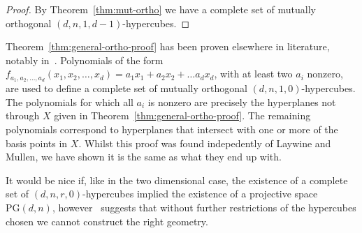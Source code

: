 \documentclass{article}
\newcommand{\PG}{\mathrm{PG}}
\begin{document}
\begin{proof}
  By Theorem~\ref{thm:mut-ortho} we have a complete set of mutually orthogonal \((d, n, 1, d - 1)\)-hypercubes.
\end{proof}


Theorem~\ref{thm:general-ortho-proof} has been proven elsewhere in literature, notably in~\cite{laywine1998discrete}. Polynomials of the form \(f_{a_1, a_2, \ldots, a_d}(x_1, x_2, \ldots, x_d) = a_1x_1 + a_2x_2 + \ldots a_d x_d\), with at least two \(a_i\) nonzero, are used to define a complete set of mutually orthogonal \((d, n, 1, 0)\)-hypercubes.
The polynomials for which all \(a_i\) is nonzero are precisely the hyperplanes not through \(X\) given in Theorem~\ref{thm:general-ortho-proof}. The remaining polynomials correspond to hyperplanes that intersect with one or more of the basis points in \(X\). Whilst this proof was found indepedently of Laywine and Mullen, 
we have shown it is the same as what they end up with.

It would be nice if, like in the two dimensional case, the existence of a complete set of \((d,n,r,0)\)-hypercubes implied the existence of a projective space \(\PG(d, n)\), 
however~\cite{morgan2000affine} suggests that without further restrictions of the hypercubes chosen we cannot construct the right geometry.



\begin{bibdiv}
  \begin{biblist}


  \end{biblist}
\end{bibdiv}
\end{document}
